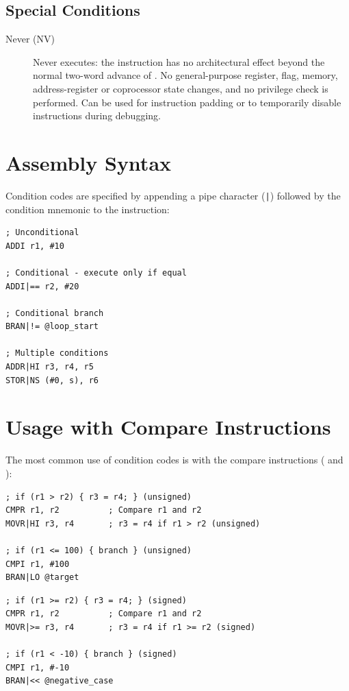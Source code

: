 \subsection{Special Conditions}

\begin{description}
	\item[Never (NV)] Never executes: the instruction has no architectural effect beyond the normal two-word advance of .
	      No general-purpose register, flag, memory, address-register or coprocessor state changes, and no privilege check is
	      performed. Can be used for instruction padding or to temporarily disable instructions during debugging.
\end{description}

\section{Assembly Syntax}

Condition codes are specified by appending a pipe character (\texttt{|}) followed by the condition mnemonic to the
instruction:

\begin{lstlisting}
; Unconditional
ADDI r1, #10

; Conditional - execute only if equal
ADDI|== r2, #20

; Conditional branch
BRAN|!= @loop_start

; Multiple conditions
ADDR|HI r3, r4, r5
STOR|NS (#0, s), r6
\end{lstlisting}

\section{Usage with Compare Instructions}

The most common use of condition codes is with the compare instructions ( and ):

\begin{example}
	\begin{lstlisting}
; if (r1 > r2) { r3 = r4; } (unsigned)
CMPR r1, r2          ; Compare r1 and r2
MOVR|HI r3, r4       ; r3 = r4 if r1 > r2 (unsigned)

; if (r1 <= 100) { branch } (unsigned)
CMPI r1, #100
BRAN|LO @target
	\end{lstlisting}
	\caption{Unsigned Comparison}
\end{example}

\begin{example}
	\begin{lstlisting}
; if (r1 >= r2) { r3 = r4; } (signed)
CMPR r1, r2          ; Compare r1 and r2
MOVR|>= r3, r4       ; r3 = r4 if r1 >= r2 (signed)

; if (r1 < -10) { branch } (signed)
CMPI r1, #-10
BRAN|<< @negative_case
	\end{lstlisting}
	\caption{Signed Comparison}
\end{example}

